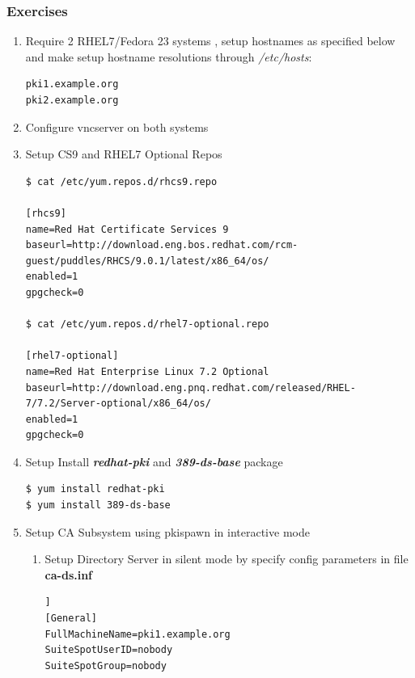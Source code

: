 \documentclass[a4paper]{article}
\begin{document}
\subsubsection{Exercises}
    \begin{enumerate}[label*=\arabic*.]
        \item \label{setup1} Require 2 RHEL7/Fedora 23 systems , setup hostnames as specified below and make setup hostname
            resolutions through \textit{/etc/hosts}:
            \begin{lstlisting}
pki1.example.org
pki2.example.org
            \end{lstlisting}
        \item \label{setup2} Configure vncserver on both systems
        \item \label{setup3} Setup CS9 and RHEL7 Optional Repos
            \begin{lstlisting}[style=BashInputStyle]
$ cat /etc/yum.repos.d/rhcs9.repo

[rhcs9]
name=Red Hat Certificate Services 9
baseurl=http://download.eng.bos.redhat.com/rcm-guest/puddles/RHCS/9.0.1/latest/x86_64/os/
enabled=1   
gpgcheck=0

$ cat /etc/yum.repos.d/rhel7-optional.repo

[rhel7-optional]
name=Red Hat Enterprise Linux 7.2 Optional
baseurl=http://download.eng.pnq.redhat.com/released/RHEL-7/7.2/Server-optional/x86_64/os/
enabled=1
gpgcheck=0
            \end{lstlisting}

        \item \label{setup4} Setup Install \textbf{\textit{redhat-pki}} and \textbf{\textit{389-ds-base}} package 

            \begin{lstlisting}[style=BashInputStyle]
$ yum install redhat-pki
$ yum install 389-ds-base
            \end{lstlisting}
        
        \item \label{rootca} Setup CA Subsystem using pkispawn in interactive mode
            \begin{enumerate}[label*=\arabic*.]
                \item \label{ds1} Setup Directory Server in silent mode by specify config parameters in file \textbf{ca-ds.inf}
                    \begin{lstlisting}[style=configFile]]
[General]
FullMachineName=pki1.example.org 
SuiteSpotUserID=nobody
SuiteSpotGroup=nobody


\end{lstlisting}
\end{enumerate}
\end{enumerate}
\end{document}
